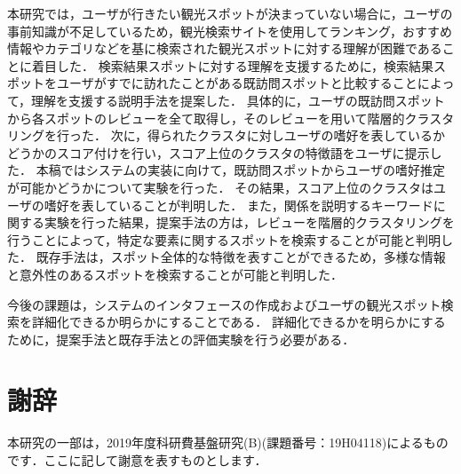 \documentclass{deimj}
\begin{document}
本研究では，ユーザが行きたい観光スポットが決まっていない場合に，ユーザの事前知識が不足しているため，観光検索サイトを使用してランキング，おすすめ情報やカテゴリなどを基に検索された観光スポットに対する理解が困難であることに着目した．
検索結果スポットに対する理解を支援するために，検索結果スポットをユーザがすでに訪れたことがある既訪問スポットと比較することによって，理解を支援する説明手法を提案した．
具体的に，ユーザの既訪問スポットから各スポットのレビューを全て取得し，そのレビューを用いて階層的クラスタリングを行った．
次に，得られたクラスタに対しユーザの嗜好を表しているかどうかのスコア付けを行い，スコア上位のクラスタの特徴語をユーザに提示した．
本稿ではシステムの実装に向けて，既訪問スポットからユーザの嗜好推定が可能かどうかについて実験を行った．
その結果，スコア上位のクラスタはユーザの嗜好を表していることが判明した．
また，関係を説明するキーワードに関する実験を行った結果，提案手法の方は，レビューを階層的クラスタリングを行うことによって，特定な要素に関するスポットを検索することが可能と判明した．
既存手法は，スポット全体的な特徴を表すことができるため，多様な情報と意外性のあるスポットを検索することが可能と判明した．

今後の課題は，システムのインタフェースの作成およびユーザの観光スポット検索を詳細化できるか明らかにすることである．
詳細化できるかを明らかにするために，提案手法と既存手法との評価実験を行う必要がある．

\section*{謝辞}
本研究の一部は，2019年度科研費基盤研究(B)(課題番号：19H04118)によるものです．ここに記して謝意を表すものとします．
\end{document}
